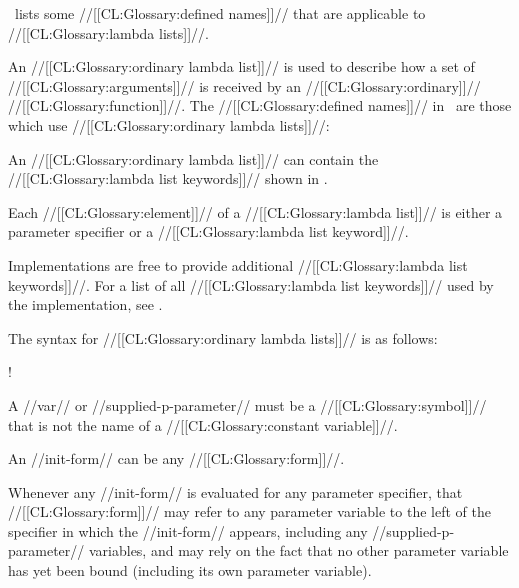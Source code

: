 \Thenextfigure\ lists some //[[CL:Glossary:defined names]]// that are applicable to //[[CL:Glossary:lambda lists]]//.


 

An //[[CL:Glossary:ordinary lambda list]]// is used to describe how a set of //[[CL:Glossary:arguments]]// is received by an //[[CL:Glossary:ordinary]]// //[[CL:Glossary:function]]//.   The //[[CL:Glossary:defined names]]// in \thenextfigure\ are those which use //[[CL:Glossary:ordinary lambda lists]]//:


An //[[CL:Glossary:ordinary lambda list]]// can contain the //[[CL:Glossary:lambda list keywords]]// shown in \thenextfigure.


Each //[[CL:Glossary:element]]// of a //[[CL:Glossary:lambda list]]// is either a parameter specifier or a //[[CL:Glossary:lambda list keyword]]//.

Implementations are free to provide additional //[[CL:Glossary:lambda list keywords]]//. For a list of all //[[CL:Glossary:lambda list keywords]]// used by the implementation, see .

The syntax for //[[CL:Glossary:ordinary lambda lists]]// is as follows: 

\Vskip 1pc! 

A //var// or //supplied-p-parameter// must be a //[[CL:Glossary:symbol]]// that is not the name of a //[[CL:Glossary:constant variable]]//.

An //init-form// can be any //[[CL:Glossary:form]]//.

Whenever any //init-form// is evaluated for any parameter specifier, that //[[CL:Glossary:form]]// may refer to any parameter variable to the left of the specifier in which the //init-form// appears, including any //supplied-p-parameter// variables, and may rely  on the fact that no other parameter variable has yet been bound (including its own parameter variable).

